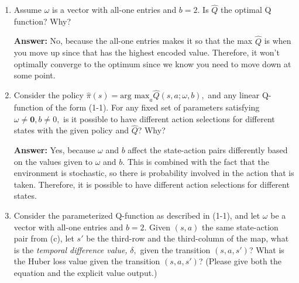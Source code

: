 \documentclass{assignment}
\begin{document}
\begin{problem}
\begin{enumerate}
\begin{enumerate}[label=(\alph*)]
\begin{enumerate}[label=\roman*.]
    
        \item Assume $\omega$ is a vector with all-one entries and $b = 2$. Is $\hat{Q}$ the optimal Q function? Why?

        \color{blue}\textbf{Answer:} 
            No, because the all-one entries makes it so that the max $\hat{Q}$ is when you move up since that has the highest encoded value. Therefore, it won't optimally converge to the optimum since we know you need to move down at some point.
        \color{black}


    
        \item Consider the policy $\hat{\pi}(s) = \text{arg max}_a \hat{Q}(s, a; \omega, b),$ and any linear Q-function of the form (1-1). For any fixed set of parameters satisfying $\omega \neq \textbf{0}, b \neq 0,$ is it possible to have different action selections for different states with the given policy and $\hat{Q}$? Why?

        \color{blue}\textbf{Answer:} 
            Yes, because $\omega$ and $b$ affect the state-action pairs differently based on the values given to $\omega$ and $b$. This is combined with the fact that the environment is stochastic, so there is probability involved in the action that is taken. Therefore, it is possible to have different action selections for different states.
        \color{black}


    
        \item Consider the parameterized Q-function as described in (1-1), and let $\omega$ be a vector with all-one entries and $b = 2$. Given $(s, a)$ the same state-action pair from (c), let $s'$ be the third-row and the third-column of the map, what is the \textit{temporal difference value,} $\delta,$ given the transition $(s, a, s')$? What is the Huber loss value given the transition $(s, a, s')$? (Please give both the equation and the explicit value output.)


\end{enumerate}
\end{enumerate}
\end{enumerate}
\end{problem}
\end{document}
